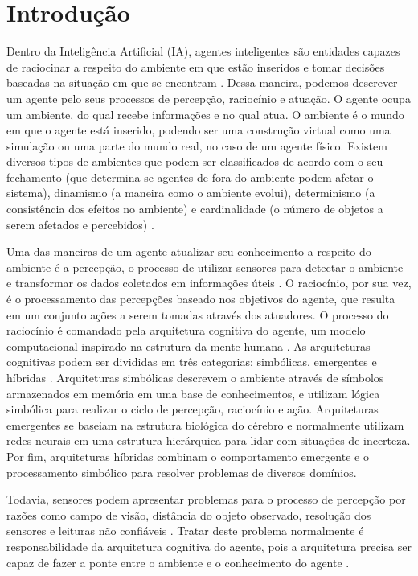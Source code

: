 \section{Introdução}

Dentro da Inteligência Artificial (IA), agentes inteligentes são entidades capazes de raciocinar a respeito do ambiente em que estão inseridos e tomar decisões baseadas na situação em que se encontram \cite{russell2016artificial}. Dessa maneira, podemos descrever um agente pelo seus processos de percepção, raciocínio e atuação. O agente ocupa um ambiente, do qual recebe informações e no qual atua. O ambiente é o mundo em que o agente está inserido, podendo ser uma construção virtual como uma simulação ou uma parte do mundo real, no caso de um agente físico. Existem diversos tipos de ambientes que podem ser classificados de acordo com o seu fechamento (que determina se agentes de fora do ambiente podem afetar o sistema), dinamismo (a maneira como o ambiente evolui), determinismo (a consistência dos efeitos no ambiente) e cardinalidade (o número de objetos a serem afetados e percebidos) \cite{moya2007towards}.

Uma das maneiras de um agente atualizar seu conhecimento a respeito do ambiente é a percepção, o processo de utilizar sensores para detectar o ambiente e transformar os dados coletados em informações úteis \cite{weyns2004towards}.  O raciocínio, por sua vez, é o processamento das percepções baseado nos objetivos do agente, que resulta em um conjunto ações a serem tomadas através dos atuadores. O processo do raciocínio é comandado pela arquitetura cognitiva do agente, um modelo computacional inspirado na estrutura da mente humana \cite{DYACHENKO2018130}. As arquiteturas cognitivas podem ser divididas em três categorias: simbólicas, emergentes e híbridas \cite{yeCognitivearchitectures}. Arquiteturas simbólicas descrevem o ambiente através de símbolos armazenados em memória em uma base de conhecimentos, e utilizam lógica simbólica para realizar o ciclo de percepção, raciocínio e ação. Arquiteturas emergentes se baseiam na estrutura biológica do cérebro e normalmente utilizam redes neurais em uma estrutura hierárquica para lidar com situações de incerteza. Por fim, arquiteturas híbridas combinam o comportamento emergente e o processamento simbólico para resolver problemas de diversos domínios. 

Todavia, sensores podem apresentar problemas para o processo de percepção por razões como campo de visão, distância do objeto observado, resolução dos sensores e leituras não confiáveis \cite{chrisman1991intelligent}. Tratar deste problema normalmente é responsabilidade da arquitetura cognitiva do agente, pois a arquitetura precisa ser capaz de fazer a ponte entre o ambiente e o conhecimento do agente \cite{langley2009cognitive}.

